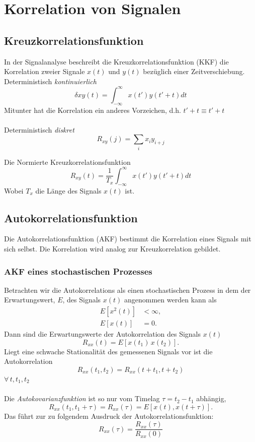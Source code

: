 \chapter{Korrelation von Signalen}

\section{Kreuzkorrelationsfunktion}

In der Signalanalyse beschreibt die Kreuzkorrelationsfunktion (KKF) die Korrelation zweier Signale $x(t)$ und $y(t)$ bezüglich einer Zeitverschiebung.\\

Deterministisch \textit{kontinuierlich}
\begin{equation}
\delta{xy}(t) = \int_{-\infty}^{\infty} x(t') y(t'+t) dt
\end{equation}
{\small Mitunter hat die Korrelation ein anderes Vorzeichen, d.h. $t'+t \equiv t'+t$}\\\\

Deterministisch \textit{diskret}
\begin{equation}
R_{xy}(j) = \sum_i x_i y_{i+j}
\end{equation}

Die Normierte Kreuzkorrelationsfunktion
\begin{equation}
R_{xy}(t) = \frac{1}{T_x} \int_{-\infty}^{\infty} x(t') y(t'+t) dt
\end{equation}
{\small Wobei $T_x$ die Länge des Signals $x(t)$ ist.}


\section{Autokorrelationsfunktion}
Die Autokorrelationsfunktion (AKF) bestimmt die Korrelation eines Signals mit sich selbst. Die Korrelation wird analog zur Kreuzkorrelation gebildet.

\subsection{AKF eines stochastischen Prozesses}
Betrachten wir die Autokorrelations als einen stochastischen Prozess in dem der Erwartungswert, $E$, des Signals $x(t)$ angenommen werden kann als
\begin{align*}
E[x^2(t)] & < \infty,\\
E[x(t)] & = 0.
\end{align*}
Dann sind die Erwartungswerte der Autokorrelation des Signals $x(t)$
\[
R_{xx}(t) = E[x(t_1)\,x(t_2)].
\]
Liegt eine schwache Stationalität des gemessenen Signals vor ist die Autokorrelation
\[
R_{xx}(t_1, t_2) = R_{xx}(t+t_1, t+t_2)
\]
{\small $\forall\,t, t_1, t_2$}\\\\
Die \textit{Autokovarianzfunktion} ist so nur vom Timelag $\tau = t_2 - t_1$ abhängig,
\[
R_{xx}(t_1, t_1+\tau) = R_{xx}(\tau) = E[x(t), x(t+\tau)].
\]
Das führt zur zu folgendem Ausdruck der Autokorrelationsfunktion:
\begin{equation}
R_{xx}(\tau) = \frac{R_{xx}(\tau)}{R_{xx}(0)}
\end{equation}



